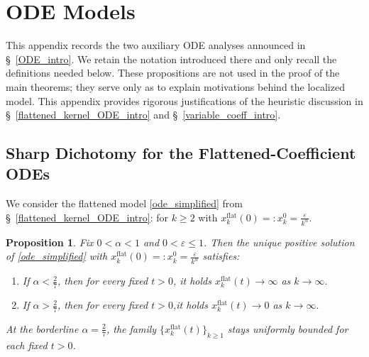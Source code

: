 \documentclass[reqno,11pt]{amsart}
\newtheorem{proposition}[theorem]{Proposition}
\begin{document}
\section{ODE Models}
\label{app:ODE_models}
This appendix records the two auxiliary ODE analyses announced in
\S~\ref{ODE_intro}.  We retain the notation introduced there and only recall the
definitions needed below.  
These propositions are not used in the proof of the
main theorems; they serve only as to explain motivations behind the localized model.
This appendix provides rigorous justifications of the heuristic discussion in
\S~\ref{flattened_kernel_ODE_intro} and \S~\ref{variable_coeff_intro}.

\subsection{Sharp Dichotomy for the Flattened-Coefficient ODEs}
\label{HAodes}

We consider the flattened model \eqref{ode_simplified} from \S~\ref{flattened_kernel_ODE_intro}:
for $k\ge2$ with $x_k^{\mathrm{flat}}(0)=:x_k^0=\frac{\varepsilon}{k^\alpha}$.

\begin{proposition}\label{prop:flat_dichotomy}
Fix $0<\alpha<1$ and $0<\varepsilon\le1$. Then the unique positive solution of
\eqref{ode_simplified} with $x_k^{\mathrm{flat}}(0)=:x_k^0=\frac{\varepsilon}{k^\alpha}$ satisfies:
\begin{enumerate}
\item If $\alpha<\frac27$, then for every fixed $t>0$,
it holds $ x_k^{\mathrm{flat}}(t)\to\infty$ as $k\to\infty.$
\item If $\alpha>\frac27$, then for every fixed $t>0$,it holds $ x_k^{\mathrm{flat}}(t)\to 0$ as $k\to\infty.$
\end{enumerate}
At the borderline $\alpha=\frac27$, the family $\{x_k^{\mathrm{flat}}(t)\}_{k\ge1}$ stays
uniformly bounded for each fixed $t>0$.
\end{proposition}
\end{document}
